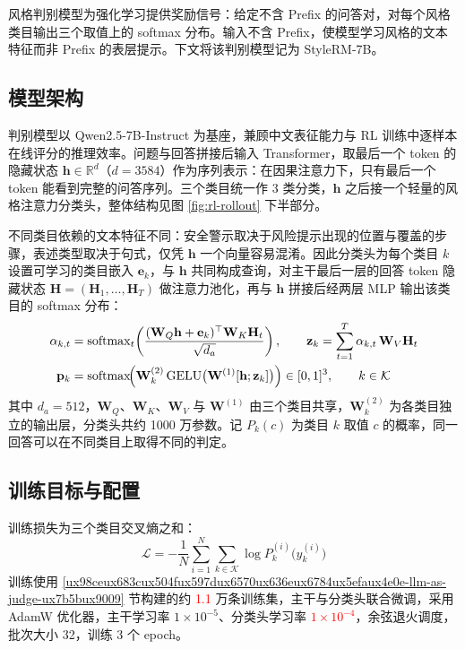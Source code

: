 \documentclass[fontset=fandol,type=master,campus=shenzhen,etitleauto=true]{hithesisbook}
\newcommand{\rev}[1]{\textcolor{red}{#1}}
\begin{document}
风格判别模型为强化学习提供奖励信号：给定不含 Prefix 的问答对，对每个风格类目输出三个取值上的 softmax 分布。输入不含 Prefix，使模型学习风格的文本特征而非 Prefix 的表层提示。下文将该判别模型记为 StyleRM-7B。

\subsection{模型架构}\label{ux6a21ux578bux67b6ux6784ux8bbeux8ba1}

判别模型以 Qwen2.5-7B-Instruct 为基座，兼顾中文表征能力与 RL 训练中逐样本在线评分的推理效率。问题与回答拼接后输入 Transformer，取最后一个 token 的隐藏状态 $\mathbf{h} \in \mathbb{R}^{d}$（$d = 3584$）作为序列表示：在因果注意力下，只有最后一个 token 能看到完整的问答序列。三个类目统一作 3 类分类，$\mathbf{h}$ 之后接一个轻量的风格注意力分类头，整体结构见图 \ref{fig:rl-rollout} 下半部分。

不同类目依赖的文本特征不同：安全警示取决于风险提示出现的位置与覆盖的步骤，表述类型取决于句式，仅凭 $\mathbf{h}$ 一个向量容易混淆。因此分类头为每个类目 $k$ 设置可学习的类目嵌入 $\mathbf{e}_k$，与 $\mathbf{h}$ 共同构成查询，对主干最后一层的回答 token 隐藏状态 $\mathbf{H} = (\mathbf{H}_1, \dots, \mathbf{H}_T)$ 做注意力池化，再与 $\mathbf{h}$ 拼接后经两层 MLP 输出该类目的 softmax 分布：
\begin{equation}
\begin{aligned}
\alpha_{k,t} &= \operatorname{softmax}_t\!\left( \frac{(\mathbf{W}_Q\mathbf{h} + \mathbf{e}_k)^{\top} \mathbf{W}_K \mathbf{H}_t}{\sqrt{d_a}} \right), \qquad \mathbf{z}_k = \sum_{t=1}^{T} \alpha_{k,t}\, \mathbf{W}_V \mathbf{H}_t \\
\mathbf{p}_k &= \operatorname{softmax}\!\Bigl( \mathbf{W}^{(2)}_k \operatorname{GELU}\bigl( \mathbf{W}^{(1)} [\mathbf{h}; \mathbf{z}_k] \bigr) \Bigr) \in [0,1]^{3}, \qquad k \in \mathcal{K}
\end{aligned}
\end{equation}
其中 $d_a = 512$，$\mathbf{W}_Q$、$\mathbf{W}_K$、$\mathbf{W}_V$ 与 $\mathbf{W}^{(1)}$ 由三个类目共享，$\mathbf{W}^{(2)}_k$ 为各类目独立的输出层，分类头共约 1000 万参数。记 $P_k(c)$ 为类目 $k$ 取值 $c$ 的概率，同一回答可以在不同类目上取得不同的判定。

\subsection{训练目标与配置}\label{ux8badux7ec3ux76eeux6807ux4e0eux4f18ux5316ux914dux7f6e-1}

训练损失为三个类目交叉熵之和：
\begin{equation}
\mathcal{L} = -\frac{1}{N}\sum_{i=1}^{N} \sum_{k \in \mathcal{K}} \log P^{(i)}_k\bigl(y^{(i)}_k\bigr)
\end{equation}
训练使用 \ref{ux98ceux683cux504fux597dux6570ux636eux6784ux5efaux4e0e-llm-as-judge-ux7b5bux9009} 节构建的约 \rev{1.1} 万条训练集，主干与分类头联合微调，采用 AdamW 优化器，主干学习率 $1 \times 10^{-5}$、分类头学习率 \rev{$1 \times 10^{-4}$}，余弦退火调度，批次大小 32，训练 3 个 epoch。
\end{document}
